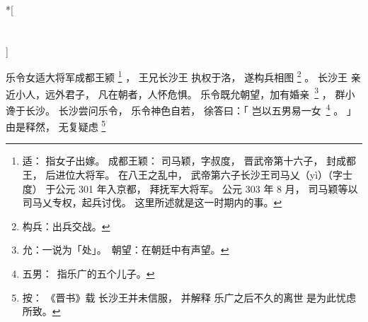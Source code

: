 
\switchcolumn[0]*[\section{}]

乐令女适大将军成都王颍%
\footnote{%
    适：
        指女子出嫁。
    成都王颖：
        司马颖，字叔度，
        晋武帝第十六子，
        封成都王，
        后进位大将军。
        在八王之乱中，
        武帝第六子长沙王司马乂（yì）（字士度）
        于公元 301 年入京都，
        拜抚军大将军。
        公元 303 年 8 月，
        司马颖等以司马乂专权，起兵讨伐。
        这里所述就是这一时期内的事。
}%
，
王兄长沙王
执权于洛，
遂构兵相图%
\footnote{%
    构兵：出兵交战。
}%
。
长沙王
亲近小人，远外君子，
凡在朝者，人怀危惧。
乐令既允朝望，加有婚\mbox{亲%
\footnote{%
    允：一说为「处」。
    朝望：在朝廷中有声望。
}}%
，
群小谗于长沙。
长沙尝问乐令，
乐令神色自若，
徐答曰：「
    岂以五男易一\mbox{女%
    \footnote{%
        五男：
            指乐广的五个儿子。
    }}%
    。
」
由是释然，
无复疑虑%
\footnote{%
    按：
        《晋书》载
        长沙王并未信服，
        并解释
        乐广之后不久的离世
        是为此忧虑所致。
}%

\switchcolumn


